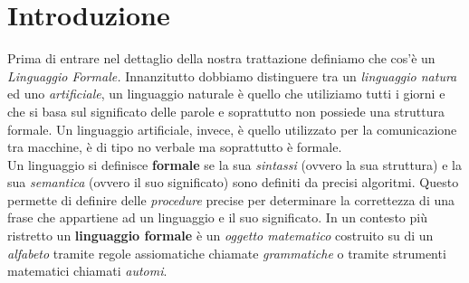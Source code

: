 \section{Introduzione}
Prima di entrare nel dettaglio della nostra trattazione definiamo che cos'è un \emph{Linguaggio Formale.} Innanzitutto dobbiamo distinguere tra un \emph{linguaggio natura} ed uno \emph{artificiale}, un linguaggio naturale è quello che utiliziamo tutti i giorni e che si basa sul significato delle parole e soprattutto non possiede una struttura formale. Un linguaggio artificiale, invece, è quello utilizzato per la comunicazione tra macchine, è di tipo no verbale ma soprattutto è formale.\\
Un linguaggio si definisce \textbf{formale} se la sua \emph{sintassi} (ovvero la sua struttura) e la sua \emph{semantica} (ovvero il suo significato) sono definiti da precisi algoritmi. Questo permette di definire delle \emph{procedure} precise per determinare la correttezza di una frase che appartiene ad un linguaggio e il suo significato. 
In un contesto più ristretto un \textbf{linguaggio formale} è un \emph{oggetto matematico} costruito su di un \emph{alfabeto} tramite regole assiomatiche chiamate \emph{grammatiche} o tramite strumenti matematici chiamati \emph{automi}.\\

